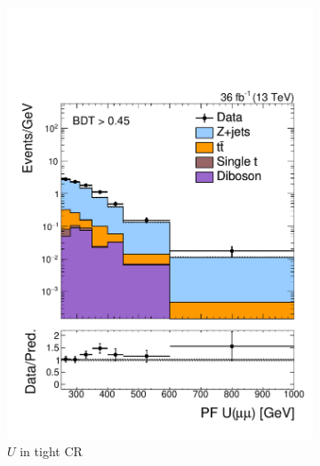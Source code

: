 \begin{figure}[]
\begin{center}
\begin{subfigure}[t]{0.49\textwidth}
            \includegraphics[width=\textwidth]{figures/monotop/prefit/dimuon_tight_pfUZmag_logy.pdf}
            \caption{$U$ in tight CR}
        \end{subfigure}
        \begin{subfigure}[t]{0.49\textwidth}

\end{subfigure}
\end{center}
\end{figure}
